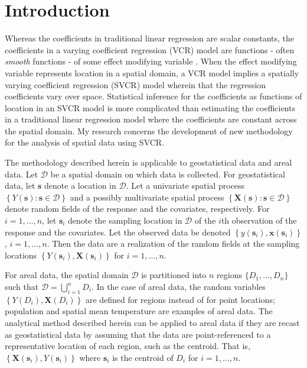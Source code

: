 \documentclass[authoryear, review, 11pt]{elsarticle}
\begin{document}
\section{Introduction}
	Whereas the coefficients in traditional linear regression are scalar constants, the coefficients in a varying coefficient regression (VCR) model are functions - often \emph{smooth} functions - of some effect modifying variable \citep{Hastie:1993a}. When the effect modifying variable represents location in a spatial domain, a VCR model implies a spatially varying coefficient regression (SVCR) model wherein that the regression coefficients vary over space. Statistical inference for the coefficients as functions of location in an SVCR model is more complicated than estimating the coefficients in a traditional linear regression model where the coefficients are constant across the spatial domain. My research concerns the development of new methodology for the analysis of spatial data using SVCR.
	
	The methodology described herein is applicable to geostatistical data and areal data. Let $\mathcal{D}$ be a spatial domain on which data is collected. For geostatistical data, let $\bm{s}$ denote a location in $\mathcal{D}$. Let a univariate spatial process $\left\{Y(\bm{s}) : \bm{s} \in \mathcal{D}\right\}$ and a possibly multivariate spatial process $\left\{\bm{X}(\bm{s}) : \bm{s} \in \mathcal{D}\right\}$ denote random fields of the response and the covariates, respectively. For $i = 1, \dots, n$, let $\bm{s}_i$ denote the sampling location in $\mathcal{D}$ of the $i$th observation of the response and the covariates. Let the observed data be denoted $\left\{y(\bm{s}_i), \bm{x}(\bm{s}_i)\right\}$, $i=1, \dots, n$. Then the data are a realization of the random fields at the sampling locations $\left\{Y(\bm{s}_i), \bm{X}(\bm{s}_i)\right\}$ for $i=1, \dots, n$.
	
	For areal data, the spatial domain $\mathcal{D}$ is partitioned into $n$ regions $\{D_1, \dots, D_n\}$ such that $\mathcal{D} = \bigcup \limits_{i=1}^nD_i$. In the case of areal data, the random variables $\left\{Y(D_i), \bm{X}(D_i)\right\}$ are defined for regions instead of for point locations; population and spatial mean temperature are examples of areal data. The analytical method described herein can be applied to areal data if they are recast as geostatistical data by assuming that the data are point-referenced to a representative location of each region, such as the centroid. That is, $\left\{\bm{X}(\bm{s}_i), Y(\bm{s}_i)\right\} $ where $\bm{s}_i$ is the centroid of $D_i$ for $i=1, \dots, n$.
	
\end{document}
